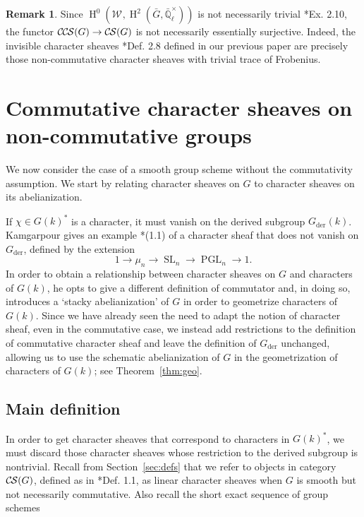 \documentclass[10pt]{amsart}
\theoremstyle{plain}
\theoremstyle{definition}
\newtheorem{remark}[theorem]{Remark}
\newcommand{\EE}{\mathbb{\bar Q}_\ell}
\newcommand{\Fq}{k}
\newcommand{\EEx}{\EE^\times}
\newcommand{\Weil}[1]{\mathcal{W}_{#1}}
\DeclareMathOperator{\Hh}{H}
\DeclareMathOperator{\SL}{SL}
\DeclareMathOperator{\PGL}{PGL}
\newcommand{\der}{_{\operatorname{der}}}
\newcommand{\CS}{{\mathcal{C\hskip-0.8pt S}}}
\newcommand{\CCS}{{\mathcal{C\hskip-.8pt C\hskip-0.8pt S}}}
\newcommand{\bG}{\bar{G}}
\begin{document}
\begin{remark}
Since $\Hh^0(\Weil{},\Hh^2(\bG,\EEx))$ is not necessarily trivial \cite{cunningham-roe:13a}*{Ex. 2.10}, the functor
$\CCS(G) \to \CS(G)$ is not necessarily essentially surjective.  Indeed, the invisible character sheaves \cite{cunningham-roe:13a}*{Def. 2.8}
defined in our previous paper are precisely those non-commutative character sheaves with trivial trace of Frobenius.
\end{remark}

\section{Commutative character sheaves on non-commutative groups}\label{sec:noncom}

We now consider the case of a smooth group scheme without the commutativity assumption.  We start
by relating character sheaves on $G$ to character sheaves on its abelianization.

If $\chi \in G(k)^*$ is a character, it must vanish on the derived subgroup $G\der(k)$.
Kamgarpour gives an example \cite{kamgarpour:09a}*{(1.1)} of a character sheaf
that does not vanish on $G\der$, defined by the extension
\[
1 \to \mu_n \to \SL_n \to \PGL_n \to 1.
\]
In order to obtain a relationship between character sheaves on $G$ and characters of $G(k)$,
he opts to give a different definition of commutator and, in doing so, introduces a `stacky abelianization' of $G$ in order to geometrize characters of $G(\Fq)$.
 Since we have already seen the need to adapt the
notion of character sheaf, even in the commutative case, we instead add restrictions
to the definition of commutative character sheaf and leave the definition of $G\der$ unchanged, allowing us to use the schematic abelianization of $G$ in the geometrization of characters of $G(\Fq)$; see Theorem~\ref{thm:geo}.

\subsection{Main definition}\label{ssec:noncomdef}

In order to get character sheaves that correspond to characters in $G(k)^*$, we must discard those
character sheaves whose restriction to the derived subgroup is nontrivial.
Recall from Section~\ref{sec:defs} that we refer to objects in category $\CS(G)$, defined as in \cite{cunningham-roe:13a}*{Def. 1.1}, as linear character sheaves when $G$ is smooth but not necessarily commutative.  Also recall the short exact sequence of group schemes
\end{document}

